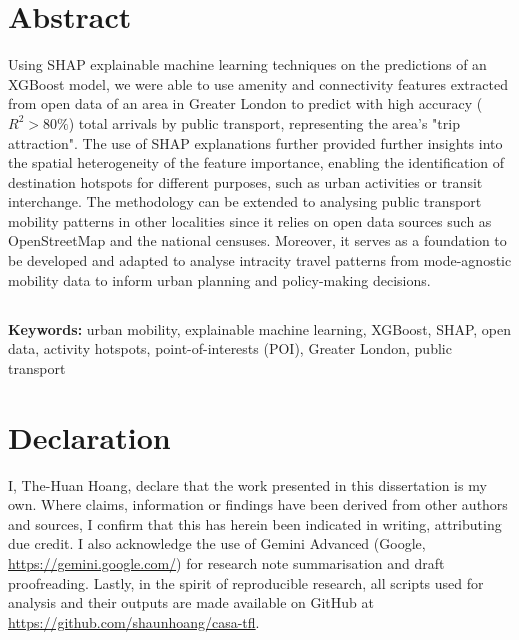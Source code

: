 \chapter*{Abstract}
Using SHAP explainable machine learning techniques on the predictions of an XGBoost model, we were able to use amenity and connectivity features extracted from open data of an area in Greater London to predict with high accuracy ($R^2>80\%$) total arrivals by public transport, representing the area's "trip attraction". The use of SHAP explanations further provided further insights into the spatial heterogeneity of the feature importance, enabling the identification of destination hotspots for different purposes, such as urban activities or transit interchange. The methodology can be extended to analysing public transport mobility patterns in other localities since it relies on open data sources such as OpenStreetMap and the national censuses. Moreover, it serves as a foundation to be developed and adapted to analyse intracity travel patterns from mode-agnostic mobility data to inform urban planning and policy-making decisions.

\section*{}
\textbf{Keywords:} urban mobility, explainable machine learning, XGBoost, SHAP, open data, activity hotspots, point-of-interests (POI), Greater London, public transport

\chapter*{Declaration}
I, The-Huan Hoang, declare that the work presented in this dissertation is my own. Where claims, information or findings have been derived from other authors and sources, I confirm that this has herein been indicated in writing, attributing due credit. I also acknowledge the use of Gemini Advanced (Google, \url{https://gemini.google.com/}) for research note summarisation and draft proofreading. Lastly, in the spirit of reproducible research, all scripts used for analysis and their outputs are made available on GitHub at \url{https://github.com/shaunhoang/casa-tfl}. 

